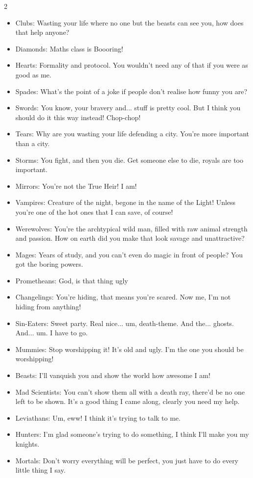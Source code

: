 \begin{multicols}{2}
\begin{itemize}
\item Clubs: Wasting your life where no one but the beasts can see you, how does that help anyone?
\item Diamonds: Maths class is Boooring!
\item Hearts: Formality and protocol. You wouldn't need any of that if you were as good as me.
\item Spades: What's the point of a joke if people don't realise how funny you are?
\item Swords: You know, your bravery and... stuff is pretty cool. But I think you should do it this way instead! Chop-chop!
\item Tears: Why are you wasting your life defending a city. You're more important than a city.
\item Storms: You fight, and then you die. Get someone else to die, royals are too important.
\item Mirrors: You're not the True Heir! I am!

\item Vampires: Creature of the night, begone in the name of the Light! Unless you're one of the hot ones that I can save, of course!
\item Werewolves: You're the archtypical wild man, filled with raw animal strength and passion. How on earth did you make that look savage and unattractive?
\item Mages: Years of study, and you can't even do magic in front of people? You got the boring powers.
\item Prometheans: God, is that thing ugly
\item Changelings: You're hiding, that means you're scared. Now me, I'm not hiding from anything!
\item Sin-Eaters: Sweet party. Real nice... um, death-theme. And the... ghosts. And... um. I have to go.
\item Mummies: Stop worshipping it! It's old and ugly. I'm the one you should be worshipping!
\item Beasts: I'll vanquish you and show the world how awesome I am!
\item Mad Scientists: You can't show them all with a death ray, there'd be no one left to be shown. It's a good thing I came along, clearly you need my help.
\item Leviathans: Um, eww! I think it's trying to talk to me.
\item Hunters: I'm glad someone's trying to do something, I think I'll make you my knights.
\item Mortals: Don't worry everything will be perfect, you just have to do every little thing I say.
\end{itemize}


\end{multicols}
